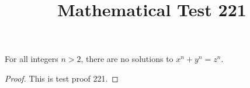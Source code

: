 \documentclass{amsart}
\begin{document}
\title{Mathematical Test 221}
\begin{theorem}
For all integers $n > 2$, there are no solutions to $x^n + y^n = z^n$.
\end{theorem}
\begin{proof}
This is test proof 221.
\end{proof}
\end{document}

